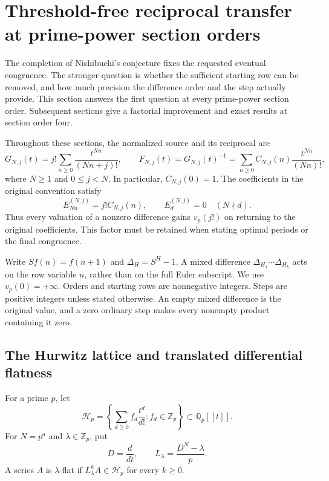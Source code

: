 \section{Threshold-free reciprocal transfer at prime-power section orders}
\label{sec:prime-power-transfer-final}

The completion of Nishibuchi's conjecture fixes the requested eventual
congruence. The stronger question is whether the sufficient starting row
can be removed, and how much precision the difference order and the step
actually provide. This section answers the first question at every
prime-power section order. Subsequent sections give a factorial improvement
and exact results at section order four.

Throughout these sections, the normalized source and its reciprocal are
\begin{equation}
 G_{N,j}(t)=j!\sum_{n\geq0}\frac{t^{Nn}}{(Nn+j)!},\qquad
 F_{N,j}(t)=G_{N,j}(t)^{-1}
   =\sum_{n\geq0}C_{N,j}(n)\frac{t^{Nn}}{(Nn)!},
 \label{eq:final-normalization}
\end{equation}
where $N\geq1$ and $0\leq j<N$. In particular, $C_{N,j}(0)=1$.
The coefficients in the original convention satisfy
\begin{equation}
 E_{Nn}^{(N,j)}=j!C_{N,j}(n),\qquad
 E_d^{(N,j)}=0\quad(N\nmid d).
 \label{eq:final-original-normalization}
\end{equation}
Thus every valuation of a nonzero difference gains $v_p(j!)$ on returning
to the original coefficients. This factor must be retained when stating
optimal periods or the final congruence.

Write $S f(n)=f(n+1)$ and $\Delta_H=S^H-1$. A mixed difference
$\Delta_{H_1}\cdots\Delta_{H_k}$ acts on the row variable $n$, rather than
on the full Euler subscript. We use $v_p(0)=+\infty$. Orders and starting
rows are nonnegative integers. Steps are positive integers unless stated
otherwise. An empty mixed difference is the original value, and a zero
ordinary step makes every nonempty product containing it zero.

\subsection{The Hurwitz lattice and translated differential flatness}

\begin{definition}
For a prime $p$, let
\[
 \mathcal H_p=\left\{\sum_{d\geq0}f_d\frac{t^d}{d!}:
                    f_d\in\mathbb Z_p\right\}
       \subset\mathbb Q_p[[t]].
\]
For $N=p^a$ and $\lambda\in\mathbb Z_p$, put
\[
 D=\frac{d}{dt},\qquad L_\lambda=\frac{D^N-\lambda}{p}.
\]
A series $A$ is $\lambda$-flat if $L_\lambda^k A\in\mathcal H_p$ for every
$k\geq0$.
\end{definition}

